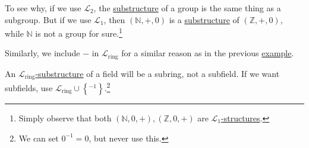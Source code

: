 To see why, if we use \(\mathcal{L} _2\), the \hyperref[def:substructure]{substructure} of a group is the same thing as a subgroup. But if we use \(\mathcal{L} _1\), then \((\mathbb{N}, +, 0)\) is a \hyperref[def:substructure]{substructure} of \((\mathbb{Z} , +, 0)\), while \(\mathbb{N} \) is not a group for sure.\footnote{Simply observe that both \((\mathbb{N} , 0, +), (\mathbb{Z} , 0, +)\) are \hyperref[def:structure]{\(\mathcal{L} _1\)-structures}.}

Similarly, we include \(-\) in \(\mathcal{L} _{\text{ring}}\) for a similar reason as in the previous \hyperref[eg:language-ring]{example}.

\begin{eg}
	An \hyperref[def:substructure]{\(\mathcal{L} _{\text{ring} }\)-substructure} of a field will be a subring, not a subfield. If we want subfields, use \(\mathcal{L} _{\text{ring} } \cup \left\{ ^{-1} \right\} \).\footnote{We can set \(0^{-1} = 0\), but never use this.}
\end{eg}